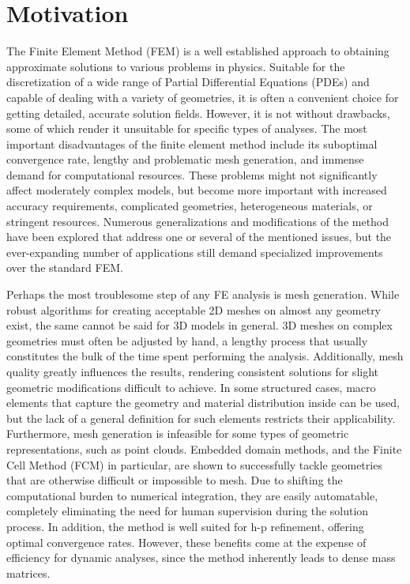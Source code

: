 %
\section{Motivation}
\label{section:motivation}
%

The Finite Element Method (FEM) is a well established approach to obtaining approximate solutions to various problems in physics. Suitable for the discretization of a wide range of Partial Differential Equations (PDEs) and capable of dealing with a variety of geometries, it is often a convenient choice for getting detailed, accurate solution fields. However, it is not without drawbacks, some of which render it unsuitable for specific types of analyses. The most important disadvantages of the finite element method include its suboptimal convergence rate, lengthy and problematic mesh generation, and immense demand for computational resources.
These problems might not significantly affect moderately complex models, but become more important with increased accuracy requirements, complicated geometries, heterogeneous materials, or stringent resources. Numerous generalizations and modifications of the method have been explored that address one or several of the mentioned issues, but the ever-expanding number of applications still demand specialized improvements over the standard FEM.

Perhaps the most troublesome step of any FE analysis is mesh generation. While robust algorithms for creating acceptable 2D meshes on almost any geometry exist, the same cannot be said for 3D models in general. 3D meshes on complex geometries must often be adjusted by hand, a lengthy process that usually constitutes the bulk of the time spent performing the analysis. Additionally, mesh quality greatly influences the results, rendering consistent solutions for slight geometric modifications difficult to achieve. In some structured cases, macro elements that capture the geometry and material distribution inside can be used, but the lack of a general definition for such elements restricts their applicability. Furthermore, mesh generation is infeasible for some types of geometric representations, such as point clouds.
Embedded domain methods, and the Finite Cell Method (FCM) in particular, are shown to successfully tackle geometries that are otherwise difficult or impossible to mesh. Due to shifting the computational burden to numerical integration, they are easily automatable, completely eliminating the need for human supervision during the solution process. In addition, the method is well suited for h-p refinement, offering optimal convergence rates. However, these benefits come at the expense of efficiency for dynamic analyses, since the method inherently leads to dense mass matrices.

